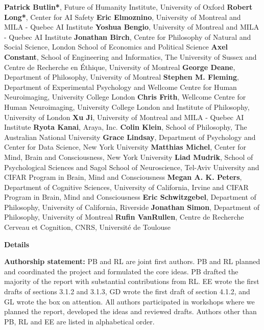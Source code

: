 \documentclass[12pt]{article}
\begin{document}
\noindent\textbf{Patrick Butlin*}, Future of Humanity Institute, University of Oxford \vfill
\noindent\textbf{Robert Long*}, Center for AI Safety \vfill
\noindent\textbf{Eric Elmoznino}, University of Montreal and MILA - Quebec AI Institute \vfill
\noindent\textbf{Yoshua Bengio}, University of Montreal and MILA - Quebec AI Institute \vfill
\noindent\textbf{Jonathan Birch}, Centre for Philosophy of Natural and Social Science, London School of Economics and Political Science \vfill
\noindent\textbf{Axel Constant}, School of Engineering and Informatics, The University of Sussex and Centre de Recherche en Éthique, University of Montreal \vfill
\noindent\textbf{George Deane}, Department of Philosophy, University of Montreal \vfill
\noindent\textbf{Stephen M. Fleming}, Department of Experimental Psychology and Wellcome Centre for Human Neuroimaging, University College London \vfill
\noindent\textbf{Chris Frith}, Wellcome Centre for Human Neuroimaging, University College London and Institute of Philosophy, University of London \vfill
\noindent\textbf{Xu Ji}, University of Montreal and MILA - Quebec AI Institute \vfill
\noindent\textbf{Ryota Kanai}, Araya, Inc. \vfill
\noindent\textbf{Colin Klein}, School of Philosophy, The Australian National University \vfill
\noindent\textbf{Grace Lindsay}, Department of Psychology and Center for Data Science, New York University \vfill
\noindent\textbf{Matthias Michel}, Center for Mind, Brain and Consciousness, New York University \vfill
\noindent\textbf{Liad Mudrik}, School of Psychological Sciences and Sagol School of Neuroscience, Tel-Aviv University and CIFAR Program in Brain, Mind and Consciousness \vfill
\noindent\textbf{Megan A. K. Peters}, Department of Cognitive Sciences, University of California, Irvine and CIFAR Program in Brain, Mind and Consciousness \vfill
\noindent\textbf{Eric Schwitzgebel}, Department of Philosophy, University of California, Riverside \vfill
\noindent\textbf{Jonathan Simon}, Department of Philosophy, University of Montreal \vfill
\noindent\textbf{Rufin VanRullen}, Centre de Recherche Cerveau et Cognition, CNRS, Université de Toulouse

\newpage

\begin{center}
    \textbf{Details}
\end{center}

\noindent\textbf{Authorship statement:} PB and RL are joint first authors. PB and RL planned and coordinated the project and formulated the core ideas. PB drafted the majority of the report with substantial contributions from RL. EE wrote the first drafts of sections 3.1.2 and 3.1.3, GD wrote the first draft of section 4.1.2, and GL wrote the box on attention. All authors participated in workshops where we planned the report, developed the ideas and reviewed drafts. Authors other than PB, RL and EE are listed in alphabetical order.
\end{document}
